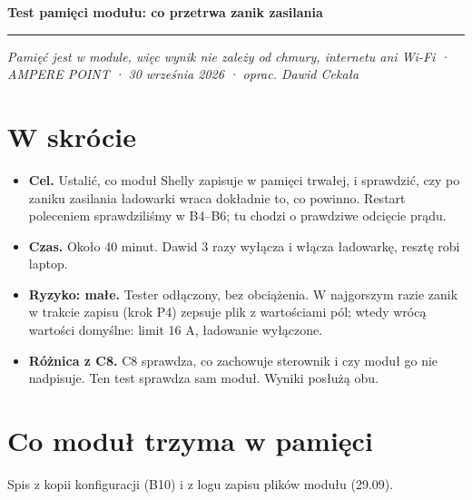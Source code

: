 \documentclass[11pt,a4paper]{article}
\begin{document}
{\LARGE\bfseries Test pamięci modułu: co przetrwa zanik zasilania\par}
\vspace{4pt}\textcolor{apteal}{\rule{\textwidth}{1.2pt}}

\emph{Pamięć jest w module, więc wynik nie zależy od chmury, internetu ani Wi-Fi · AMPERE POINT · 30 września 2026 · oprac. Dawid Cekała}


\section*{W skrócie}

\begin{itemize}
\item \textbf{Cel.} Ustalić, co moduł Shelly zapisuje w pamięci trwałej, i sprawdzić, czy po zaniku zasilania ładowarki wraca dokładnie to, co powinno. Restart poleceniem sprawdziliśmy w B4–B6; tu chodzi o prawdziwe odcięcie prądu.
\item \textbf{Czas.} Około 40 minut. Dawid 3 razy wyłącza i włącza ładowarkę, resztę robi laptop.
\item \textbf{Ryzyko: małe.} Tester odłączony, bez obciążenia. W najgorszym razie zanik w trakcie zapisu (krok P4) zepsuje plik z wartościami pól; wtedy wrócą wartości domyślne: limit 16 A, ładowanie wyłączone.
\item \textbf{Różnica z C8.} C8 sprawdza, co zachowuje sterownik i czy moduł go nie nadpisuje. Ten test sprawdza sam moduł. Wyniki posłużą obu.
\end{itemize}

\section*{Co moduł trzyma w pamięci}

Spis z kopii konfiguracji (B10) i z logu zapisu plików modułu (29.09).
\end{document}
